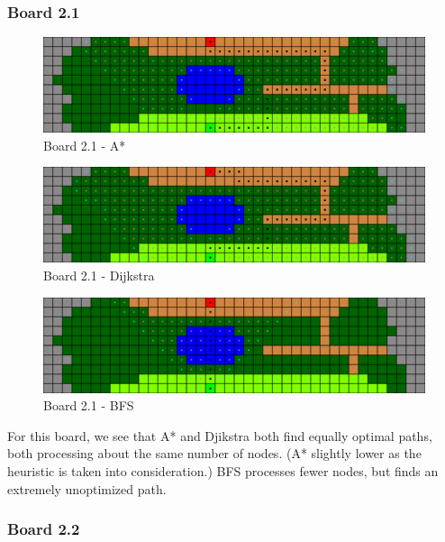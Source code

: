 \newpage

\subsubsection*{Board 2.1}

\begin{figure}[h!]
  \centering
    \includegraphics[width=\textwidth]{img/board-2-1-astar}
    \caption{Board 2.1 - A*}
\end{figure}

\begin{figure}[h!]
  \centering
    \includegraphics[width=\textwidth]{img/board-2-1-dijkstra}
    \caption{Board 2.1 - Dijkstra}
\end{figure}

\begin{figure}[h!]
  \centering
    \includegraphics[width=\textwidth]{img/board-2-1-bfs}
    \caption{Board 2.1 - BFS}
\end{figure}

For this board, we see that A* and Djikstra both find equally optimal paths,
both processing about the same number of nodes. (A* slightly lower as the 
heuristic is taken into consideration.) BFS processes fewer nodes, but finds an
extremely unoptimized path.

\newpage

\subsubsection*{Board 2.2}


